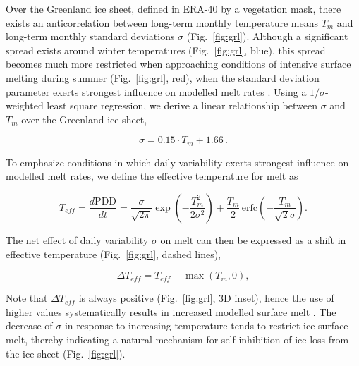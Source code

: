 \documentclass[review]{igs}
\begin{document}
Over the Greenland ice sheet, defined in ERA-40 by a vegetation mask, there exists an anticorrelation between long-term monthly temperature means $T_{m}$ and long-term monthly standard deviations $\sigma$ (Fig.~\ref{fig:grl}). Although a significant spread exists around winter temperatures (Fig.~\ref{fig:grl}, blue), this spread becomes much more restricted when approaching conditions of intensive surface melting during summer (Fig.~\ref{fig:grl}, red), when the standard deviation parameter exerts strongest influence on modelled melt rates \citep{rogozhina-rau-2014}. Using a $1/\sigma$-weighted least square regression, we derive a linear relationship between $\sigma$ and $T_{m}$ over the Greenland ice sheet,

\begin{equation} \label{eq:sigma}
    \sigma = 0.15 \cdot T_{m} + 1.66\,.
\end{equation}

To emphasize conditions in which daily variability exerts strongest influence on modelled melt rates, we define the effective temperature for melt as

\begin{equation} \label{eq:teff}
    T_{eff} = \frac{d\mathrm{PDD}}{dt}
        = \frac{\sigma}{\sqrt{2\pi}} \exp\left({-\frac{T_{m}^2}{2\sigma^2}}\right)
            + \frac{T_{m}}{2} \, \mathrm{erfc} \left(-\frac{T_{m}}{\sqrt{2}\sigma}\right).
\end{equation}

The net effect of daily variability $\sigma$ on melt can then be expressed as a shift in effective temperature (Fig.~\ref{fig:grl}, dashed lines),

\begin{equation} \label{eq:dteff}
    \Delta T_{eff} = T_{eff} - \max(T_{m}, 0),
\end{equation}

Note that $\Delta T_{eff}$ is always positive (Fig.~\ref{fig:grl}, 3D inset), hence the use of higher values systematically results in increased modelled surface melt \citep{rogozhina-rau-2014}. The decrease of $\sigma$ in response to increasing temperature tends to restrict ice surface melt, thereby indicating a natural mechanism for self-inhibition of ice loss from the ice sheet (Fig.~\ref{fig:grl}).
\end{document}
